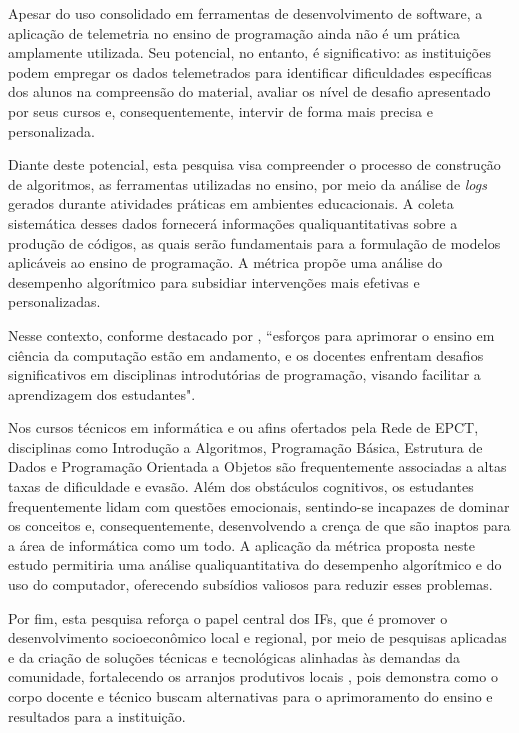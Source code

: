 Apesar do uso consolidado em ferramentas de desenvolvimento de software, a aplicação de telemetria no ensino de 
programação ainda não é um prática amplamente utilizada. Seu potencial, no entanto, é significativo: as 
instituições podem empregar os dados telemetrados para identificar dificuldades específicas dos alunos na 
compreensão do material, avaliar os nível de desafio apresentado por seus cursos e, consequentemente, intervir 
de forma mais precisa e personalizada.

Diante deste potencial, esta pesquisa visa compreender o processo de construção de algoritmos, as 
ferramentas utilizadas no ensino, por meio da análise de \textit{logs} gerados durante atividades práticas em ambientes educacionais. A coleta sistemática desses dados fornecerá informações qualiquantitativas sobre a produção de códigos, as quais serão fundamentais para a formulação de modelos aplicáveis ao ensino de programação. A métrica propõe uma análise do desempenho algorítmico para subsidiar intervenções mais efetivas e personalizadas.

Nesse contexto, conforme destacado por \cite{qian2017students}, ``esforços para aprimorar o ensino em ciência 
da computação estão em andamento, e os docentes enfrentam desafios significativos em disciplinas introdutórias 
de programação, visando facilitar a aprendizagem dos estudantes". 

Nos cursos técnicos em informática e ou afins ofertados pela Rede de EPCT, disciplinas como Introdução a 
Algoritmos, Programação Básica, Estrutura de Dados e Programação Orientada a Objetos são frequentemente 
associadas a altas taxas de dificuldade e evasão. Além dos obstáculos cognitivos, os estudantes frequentemente 
lidam com questões emocionais, sentindo-se incapazes de dominar os conceitos e, consequentemente, desenvolvendo 
a crença de que são inaptos para a área de informática como um todo. A aplicação da métrica proposta neste 
estudo permitiria uma análise qualiquantitativa do desempenho algorítmico e do uso do computador, oferecendo 
subsídios valiosos para reduzir esses problemas.

Por fim, esta pesquisa reforça o papel central dos IFs, que é promover o desenvolvimento socioeconômico local e 
regional, por meio de pesquisas aplicadas e da criação de soluções técnicas e tecnológicas alinhadas às 
demandas da comunidade, fortalecendo os arranjos produtivos locais \cite{rodriguesuniversidades}, pois 
demonstra como o corpo docente e técnico buscam alternativas para o aprimoramento do ensino e resultados para a 
instituição. 

